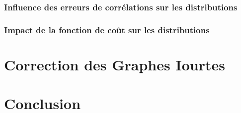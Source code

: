 \documentclass[onecolumn, 12pt]{book}
\begin{document}
\subsubsection{Influence des erreurs de corr\'elations sur les distributions}

\subsubsection{Impact de la fonction de co\^ut sur les distributions}


\section{Correction des Graphes Iourtes}


\section{Conclusion}
\end{document}
